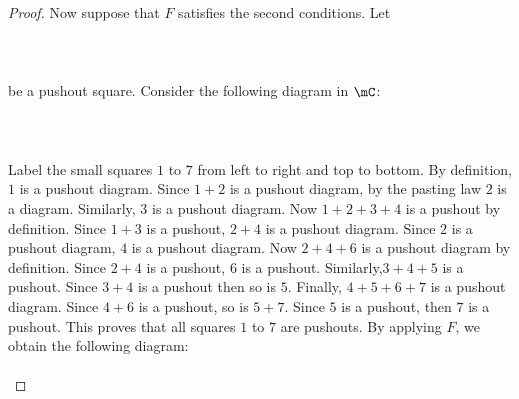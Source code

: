 \documentclass[a4paper]{article}
\begin{document}
\begin{prp}{}{}
\begin{proof}
Now suppose that $F$ satisfies the second conditions. Let \\~\\
\\~\\
be a pushout square. Consider the following diagram in $\mC$: \\~\\
\\~\\
Label the small squares $1$ to $7$ from left to right and top to bottom. By definition, $1$ is a pushout diagram. Since $1+2$ is a pushout diagram, by the pasting law $2$ is a diagram. Similarly, $3$ is a pushout diagram. Now $1+2+3+4$ is a pushout by definition. Since $1+3$ is a pushout, $2+4$ is a pushout diagram. Since $2$ is a pushout diagram, $4$ is a pushout diagram. Now $2+4+6$ is a pushout diagram by definition. Since $2+4$ is a pushout, $6$ is a pushout. Similarly,$3+4+5$ is a pushout. Since $3+4$ is a pushout then so is $5$. Finally, $4+5+6+7$ is a pushout diagram. Since $4+6$ is a pushout, so is $5+7$. Since $5$ is a pushout, then $7$ is a pushout. This proves that all squares $1$ to $7$ are pushouts. By applying $F$, we obtain the following diagram: \\~\\
\end{proof}
\end{prp}
\end{document}
